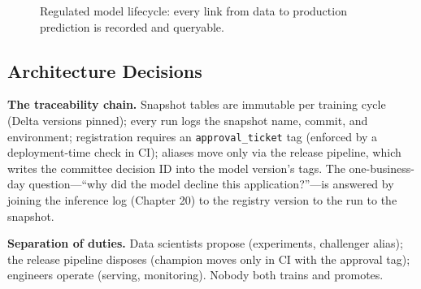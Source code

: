 \begin{figure}[H]
    \centering
    \caption{Regulated model lifecycle: every link from data to production prediction is recorded and queryable.}
    \label{fig:ch17-governance}
\end{figure}

\subsection{Architecture Decisions}
\textbf{The traceability chain.} Snapshot tables are immutable per training cycle (Delta versions pinned); every run logs the snapshot name, commit, and environment; registration requires an \texttt{approval\_ticket} tag (enforced by a deployment-time check in CI); aliases move only via the release pipeline, which writes the committee decision ID into the model version's tags. The one-business-day question---``why did the model decline this application?''---is answered by joining the inference log (Chapter 20) to the registry version to the run to the snapshot.

\textbf{Separation of duties.} Data scientists propose (experiments, challenger alias); the release pipeline disposes (champion moves only in CI with the approval tag); engineers operate (serving, monitoring). Nobody both trains and promotes.

